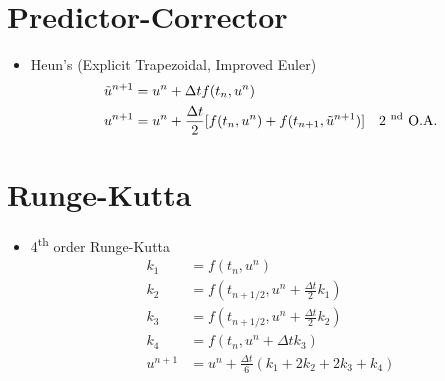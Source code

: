 \documentclass[oneside,a4paper,11pt]{report}
\begin{document}
\section{Predictor-Corrector}
\begin{itemize}

\item Heun's (Explicit Trapezoidal, Improved Euler)
\begin{align}
\tilde{u}^{n+1} &= u^n + \Delta t f(t_n, u^n) \nonumber \\
u^{n+1}   &= u^n + \frac{\Delta t}{2} [ f(t_n, u^n) + f(t_{n+1}, \tilde{u}^{n+1}) ] \quad \text{2 \textsuperscript{nd} O.A.}
\end{align}

\end{itemize}

\section{Runge-Kutta}
\begin{itemize}
\item 4\textsuperscript{th} order Runge-Kutta
\begin{align}
k_1 &= f(t_n, u^n) \nonumber \\
k_2 & = f(t_{n+1/2}, u^n + \frac{\Delta t}{2} k_1) \nonumber \\
k_3 & = f(t_{n+1/2}, u^n + \frac{\Delta t}{2} k_2) \nonumber \\
k_4 & = f(t_n, u^n + \Delta t k_3) \nonumber \\
u^{n+1} &= u^n + \frac{\Delta t}{6} (k_1 + 2k_2 + 2k_3 + k_4)
\end{align}
\end{itemize}

\end{document}

